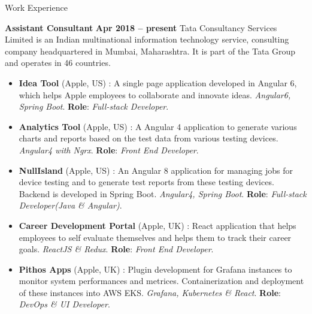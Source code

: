 \documentclass{resume}
\begin{document}
\begin{category}{Work Experience}
  
  \citemnobullet \textbf{Assistant Consultant} \hfill \textbf{Apr 2018 -- present}
  \citemnobullet Tata Consultancy Services Limited is an Indian multinational information technology service, consulting company headquartered in Mumbai, Maharashtra. It is part of the Tata Group and operates in 46 countries.
  \begin{itemize}
  \item \textbf{Idea Tool} (Apple, US) : A single page application developed in Angular 6, which helps Apple employees to collaborate and innovate ideas. {\em Angular6, Spring Boot}. \textbf{Role}: {\em Full-stack Developer}. 
  \item \textbf{Analytics Tool} (Apple, US) : A Angular 4 application to generate various charts and reports based on the test data from various testing devices. {\em Angular4 with Ngrx}. \textbf{Role}: {\em Front End Developer}. 
  \item \textbf{NullIsland} (Apple, US) : An Angular 8 application for managing jobs for device testing and to generate test reports from these testing devices. Backend is developed in Spring Boot. {\em Angular4, Spring Boot}. \textbf{Role}: {\em Full-stack Developer(Java \& Angular)}. 
  \item \textbf{Career Development Portal} (Apple, UK) : React application that helps employees to self evaluate themselves and helps them to track their career goals. {\em ReactJS \& Redux}. \textbf{Role}: {\em Front End Developer}. 
  \item \textbf{Pithos Apps} (Apple, UK) : Plugin development for Grafana instances to monitor system performances and metrices. Containerization and deployment of these instances into AWS EKS. {\em Grafana, Kubernetes \& React}. \textbf{Role}: {\em DevOps \& UI Developer}.   
  \end{itemize}


\end{category}
\end{document}
